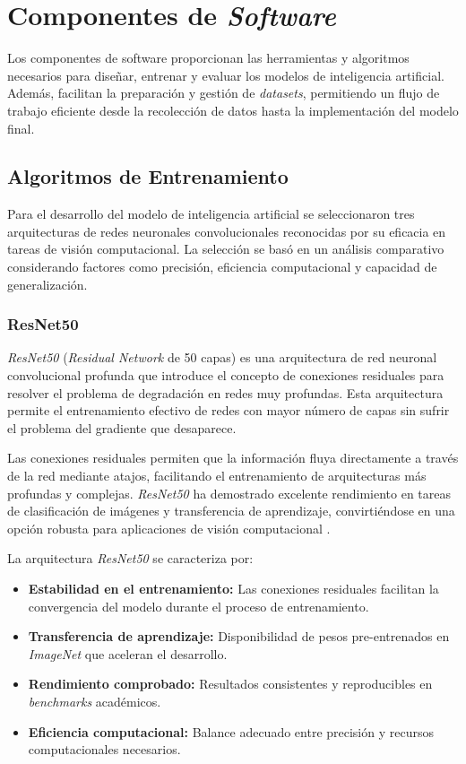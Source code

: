 \section{Componentes de \textit{Software}}

Los componentes de software proporcionan las herramientas y algoritmos necesarios para diseñar, entrenar y evaluar los modelos de inteligencia artificial. Además, facilitan la preparación y gestión de \textit{datasets}, permitiendo un flujo de trabajo eficiente desde la recolección de datos hasta la implementación del modelo final.

\subsection{Algoritmos de Entrenamiento}

Para el desarrollo del modelo de inteligencia artificial se seleccionaron tres arquitecturas de redes neuronales convolucionales reconocidas por su eficacia en tareas de visión computacional. La selección se basó en un análisis comparativo considerando factores como precisión, eficiencia computacional y capacidad de generalización.

\subsubsection{ResNet50}

\textit{ResNet50} (\textit{Residual Network} de 50 capas) es una arquitectura de red neuronal convolucional profunda que introduce el concepto de conexiones residuales para resolver el problema de degradación en redes muy profundas. Esta arquitectura permite el entrenamiento efectivo de redes con mayor número de capas sin sufrir el problema del gradiente que desaparece.

Las conexiones residuales permiten que la información fluya directamente a través de la red mediante atajos, facilitando el entrenamiento de arquitecturas más profundas y complejas. \textit{ResNet50} ha demostrado excelente rendimiento en tareas de clasificación de imágenes y transferencia de aprendizaje, convirtiéndose en una opción robusta para aplicaciones de visión computacional \cite{He2016Deep}.

La arquitectura \textit{ResNet50} se caracteriza por:

\begin{itemize}
    \item \textbf{Estabilidad en el entrenamiento:} Las conexiones residuales facilitan la convergencia del modelo durante el proceso de entrenamiento.
    \item \textbf{Transferencia de aprendizaje:} Disponibilidad de pesos pre-entrenados en \textit{ImageNet} que aceleran el desarrollo.
    \item \textbf{Rendimiento comprobado:} Resultados consistentes y reproducibles en \textit{benchmarks} académicos.
    \item \textbf{Eficiencia computacional:} Balance adecuado entre precisión y recursos computacionales necesarios.
\end{itemize}


